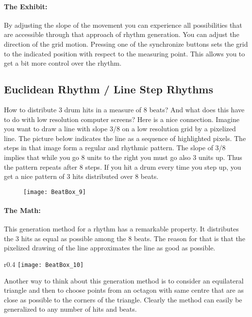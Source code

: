 \paragraph{The Exhibit:} By adjusting the slope of the movement you can experience all possibilities that are accessible through that approach of rhythm generation. You can adjust the direction of the grid motion. Pressing one of the synchronize buttons sets the grid to the indicated position with respect to the measuring point. This allows you to get a bit more control over the rhythm.


\subsection{Euclidean Rhythm / Line Step Rhythms}
How to distribute 3 drum hits in a measure of 8 beats? And what does this have to do with low resolution computer screens? Here is a nice connection. Imagine you want to draw a line with slope 3/8 on a low resolution grid by a pixelized line. The picture below indicates the line as a sequence of highlighted pixels. The steps in that image form a regular and rhythmic pattern. The slope of 3/8 implies that while you go 8 units to the right you must go also 3 units up. Thus the pattern repeats after 8 steps. If you hit a drum every time you step up, you get a nice pattern of 3 hits distributed over 8 beats.

\begin{figure}[h]
\centering
\texttt{[image: BeatBox\_9]}
\end{figure}

\paragraph{The Math:} This generation method for a rhythm has a remarkable property. It distributes the 3 hits as equal as possible among the 8 beats.
The reason for that is that the pixelized drawing of the line approximates the line as good as possible.
\begin{wrapfigure}[13]{r}{0.4\textwidth}
\centering
\texttt{[image: BeatBox\_10]}
\end{wrapfigure}
 Another way to think about this generation method is to consider an equilateral triangle and then to choose points from an octagon with same centre that are as close as possible to the corners of the triangle. Clearly the method can easily be generalized to any number of hits and beats.

